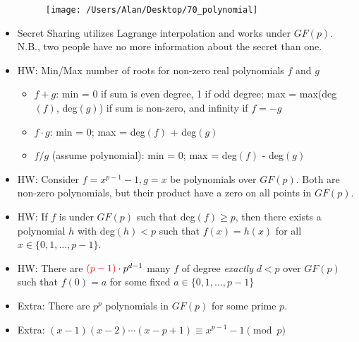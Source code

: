 \documentclass{article}
\begin{document}
\begin{itemize}
\begin{figure} [h!]
\begin{center}
	\texttt{[image: /Users/Alan/Desktop/70\_polynomial]}
	\label{fig}
\end{center}
\end{figure}
	\item Secret Sharing utilizes Lagrange interpolation and works under $GF(p)$. {\color{red} N.B.}, two people have no more information about the secret than one.
	\item HW: Min/Max number of roots for non-zero real polynomials $f$ and $g$
	\begin{itemize}
		\item $f+g$: {\color{red} min} = 0 if sum is even degree, 1 if odd degree; {\color{red} max} = max(deg$(f)$, deg$(g)$) if sum is non-zero, and infinity if $f=-g$
		\item $f\cdot g$: {\color{red} min} = 0; {\color{red} max} = deg$(f)$ + deg$(g)$
		\item $f/g$ (assume polynomial): {\color{red} min} = 0; {\color{red} max} = deg$(f)$ - deg$(g)$
	\end{itemize}
	\item HW: Consider $f = x^{p-1}-1, g=x$ be polynomials over $GF(p)$. Both are non-zero polynomials, but their product have a zero on all points in $GF(p)$.
	\item HW: If $f$ is under $GF(p)$ such that deg$(f)\geq p$, then there exists a polynomial $h$ with deg$(h) < p$ such that $f(x) = h(x)$ for all $x \in \{0, 1, \dots, p-1\}$.
	\item HW: There are ${\color{red} (p-1)}\cdot p^{d-1}$ many $f$ of degree \textit{exactly} $d < p$ over $GF(p)$ such that $f(0) = a$ for some fixed $a \in\{0,1,\dots,p-1\}$
	\item Extra: There are $p^p$ polynomials in $GF(p)$ for some prime $p$.
	\item Extra: $(x-1)(x-2)\cdots(x-p+1)\equiv x^{p-1}-1 \pmod{p}$
\end{itemize}
\end{document}
